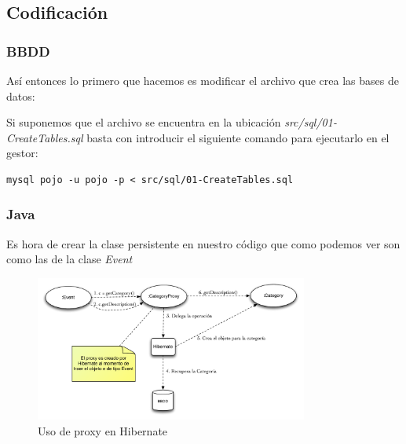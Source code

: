 \documentclass{article}
\begin{document}
\subsection{Codificación}

\subsubsection{BBDD}
	Así entonces lo primero que hacemos es modificar el archivo que crea las bases de datos:


	Si suponemos que el archivo se encuentra en la ubicación \emph{src/sql/01-CreateTables.sql} basta con introducir el siguiente comando para ejecutarlo en el gestor:
\begin{lstlisting}[style=bash]
 mysql pojo -u pojo -p < src/sql/01-CreateTables.sql
\end{lstlisting}

\subsubsection{Java}
	Es hora de crear la clase persistente en nuestro código que como podemos ver son como las de la clase \emph{Event}


\begin{figure}[h]
  \centering
    \includegraphics[width=0.8\textwidth]{commit04/img/Proxy.pdf}
  \caption{Uso de proxy en Hibernate}
  \label{fig:c04:Proxy}
\end{figure}	
\end{document}
